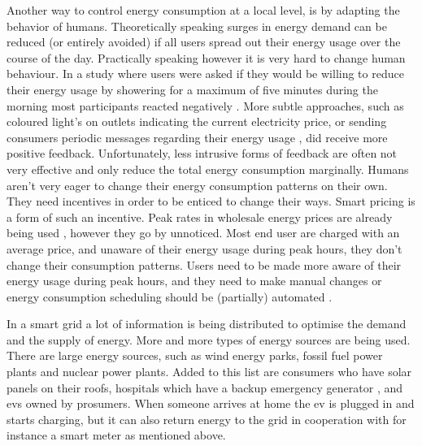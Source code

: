 Another way to control energy consumption at a local level, is by adapting the behavior of humans. Theoretically speaking surges in energy demand can be reduced (or entirely avoided) if all users spread out their energy usage over the course of the day. Practically speaking however it is very hard to change human behaviour. In a study where users were asked if they would be willing to reduce their energy usage by showering for a maximum of five minutes during the morning most participants reacted negatively \cite{GouldenBedwellRennick-EgglestoneEtAl2014}. More subtle approaches, such as coloured light's on outlets indicating the current electricity price, or sending consumers periodic messages regarding their energy usage \cite{AyresRasemanShih2012}, did receive more positive feedback. Unfortunately, less intrusive forms of feedback are often not very effective and only reduce the total energy consumption marginally. Humans aren’t very eager to change their energy consumption patterns on their own. They need incentives in order to be enticed to change their ways. Smart pricing is a form of such an incentive. Peak rates in wholesale energy prices are already being used \cite{SamadiMohsenian-RadSchoberEtAl2012}, however they go by unnoticed. Most end user are charged with an average price, and unaware of their energy usage during peak hours, they don’t change their consumption patterns. Users need to be made more aware of their energy usage during peak hours, and they need to make manual changes \cite{Mohsenian-RadLeon-Garcia2010} or energy consumption scheduling should be (partially) automated \cite{SamadiMohsenian-RadSchoberEtAl2012}.

In a smart grid a lot of information is being distributed to optimise the demand and the supply of energy. More and more types of energy sources are being used. There are large energy sources, such as wind energy parks, fossil fuel power plants and nuclear power plants. Added to this list are consumers who have solar panels on their roofs, hospitals which have a backup emergency generator \cite{Kumagai2012}, and \glspl{ev} owned by prosumers. When someone arrives at home the \gls{ev} is plugged in and starts charging, but it can also return energy to the grid in cooperation with for instance a smart meter as mentioned above.

